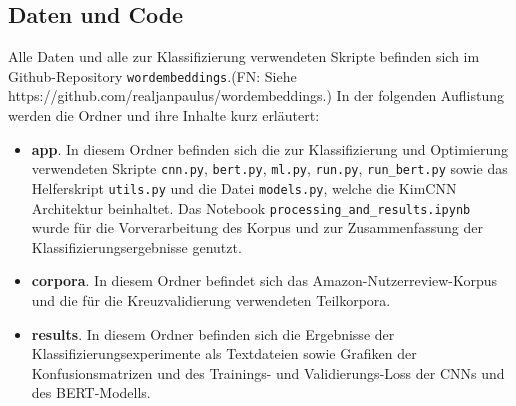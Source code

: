 \documentclass[11pt]{article}
\makeatletter
\providecommand{\tightlist}{%
      \setlength{\itemsep}{0pt}\setlength{\parskip}{0pt}}
\newcommand{\boxspacing}{\kern\kvtcb@left@rule\kern\kvtcb@boxsep}
\newcommand{\prompt}[4]{
        \ttfamily\llap{{\color{#2}[#3]:\hspace{3pt}#4}}\vspace{-\baselineskip}
    }
\makeatother
\begin{document}
\hypertarget{daten-und-code}{%
\subsection{Daten und Code}\label{daten-und-code}}

Alle Daten und alle zur Klassifizierung verwendeten Skripte befinden
sich im Github-Repository \texttt{wordembeddings}.(FN: Siehe
https://github.com/realjanpaulus/wordembeddings.) In der folgenden
Auflistung werden die Ordner und ihre Inhalte kurz erläutert:

\begin{itemize}
\tightlist
\item
  \textbf{app}. In diesem Ordner befinden sich die zur Klassifizierung
  und Optimierung verwendeten Skripte \texttt{cnn.py}, \texttt{bert.py},
  \texttt{ml.py}, \texttt{run.py}, \texttt{run\_bert.py} sowie das
  Helferskript \texttt{utils.py} und die Datei \texttt{models.py},
  welche die KimCNN Architektur beinhaltet. Das Notebook
  \texttt{processing\_and\_results.ipynb} wurde für die Vorverarbeitung
  des Korpus und zur Zusammenfassung der Klassifizierungsergebnisse
  genutzt.
\item
  \textbf{corpora}. In diesem Ordner befindet sich das
  Amazon-Nutzerreview-Korpus und die für die Kreuzvalidierung
  verwendeten Teilkorpora.
\item
  \textbf{results}. In diesem Ordner befinden sich die Ergebnisse der
  Klassifizierungsexperimente als Textdateien sowie Grafiken der
  Konfusionsmatrizen und des Trainings- und Validierungs-Loss der CNNs
  und des BERT-Modells.
\end{itemize}

    \begin{tcolorbox}[breakable, size=fbox, boxrule=1pt, pad at break*=1mm,colback=cellbackground, colframe=cellborder]
\prompt{In}{incolor}{ }{\boxspacing}
\begin{Verbatim}[commandchars=\\\{\}]

\end{Verbatim}
\end{tcolorbox}


    
    
    
\end{document}
